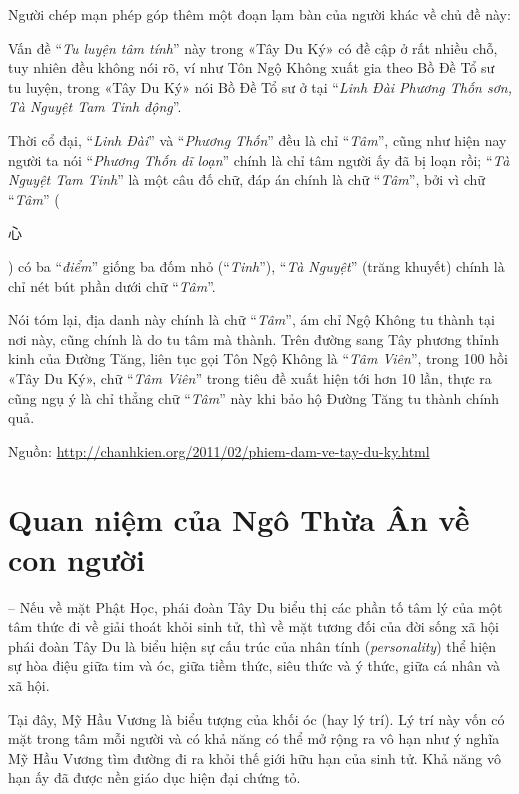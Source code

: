\begin{footnotesize}
Người chép mạn phép góp thêm một đoạn lạm bàn của người khác về chủ đề này:

Vấn đề ``\emph{Tu luyện tâm tính}'' này trong «Tây Du Ký» có đề cập ở rất nhiều chỗ, tuy nhiên đều không nói rõ, ví như Tôn Ngộ Không xuất gia theo Bồ Đề Tổ sư tu luyện, trong «Tây Du Ký» nói Bồ Đề Tổ sư ở tại ``\emph{Linh Đài Phương Thốn sơn, Tà Nguyệt Tam Tinh động}''.

Thời cổ đại, ``\emph{Linh Đài}'' và ``\emph{Phương Thốn}'' đều là chỉ ``\emph{Tâm}'', cũng như hiện nay người ta nói ``\emph{Phương Thốn dĩ loạn}'' chính là chỉ tâm người ấy đã bị loạn rồi; ``\emph{Tà Nguyệt Tam Tinh}'' là một câu đố chữ, đáp án chính là chữ ``\emph{Tâm}'', bởi vì chữ ``\emph{Tâm}'' (\begin{CJK*}{UTF8}{bkai}心\end{CJK*}) có ba ``\emph{điểm}'' giống ba đốm nhỏ (``\emph{Tinh}''), ``\emph{Tà Nguyệt}'' (trăng khuyết) chính là chỉ nét bút phần dưới chữ ``\emph{Tâm}''.

Nói tóm lại, địa danh này chính là chữ ``\emph{Tâm}'', ám chỉ Ngộ Không tu thành tại nơi này, cũng chính là do tu tâm mà thành. Trên đường sang Tây phương thỉnh kinh của Đường Tăng, liên tục gọi Tôn Ngộ Không là ``\emph{Tâm Viên}'', trong 100 hồi «Tây Du Ký», chữ ``\emph{Tâm Viên}'' trong tiêu đề xuất hiện tới hơn 10 lần, thực ra cũng ngụ ý là chỉ thẳng chữ ``\emph{Tâm}'' này khi bảo hộ Đường Tăng tu thành chính quả.

Nguồn: \href{http://chanhkien.org/2011/02/phiem-dam-ve-tay-du-ky.html}{http://chanhkien.org/2011/02/phiem-dam-ve-tay-du-ky.html}
\end{footnotesize}

\hrulefill

\section{Quan niệm của Ngô Thừa Ân về con người} %
\label{sec:1_quan_niem_ve_con_nguoi}

-- Nếu về mặt Phật Học, phái đoàn Tây Du biểu thị các phần tố tâm lý của một tâm thức đi về giải thoát khỏi sinh tử, thì về mặt tương đối của đời sống xã hội phái đoàn Tây Du là biểu hiện sự cấu trúc của nhân tính (\emph{personality}) thể hiện sự hòa điệu giữa tim và óc, giữa tiềm thức, siêu thức và ý thức, giữa cá nhân và xã hội.

Tại đây, Mỹ Hầu Vương là biểu tượng của khối óc (hay lý trí). Lý trí này vốn có mặt trong tâm mỗi người và có khả năng có thể mở rộng ra vô hạn như ý nghĩa Mỹ Hầu Vương tìm đường đi ra khỏi thế giới hữu hạn của sinh tử. Khả năng vô hạn ấy đã được nền giáo dục hiện đại chứng tỏ.

